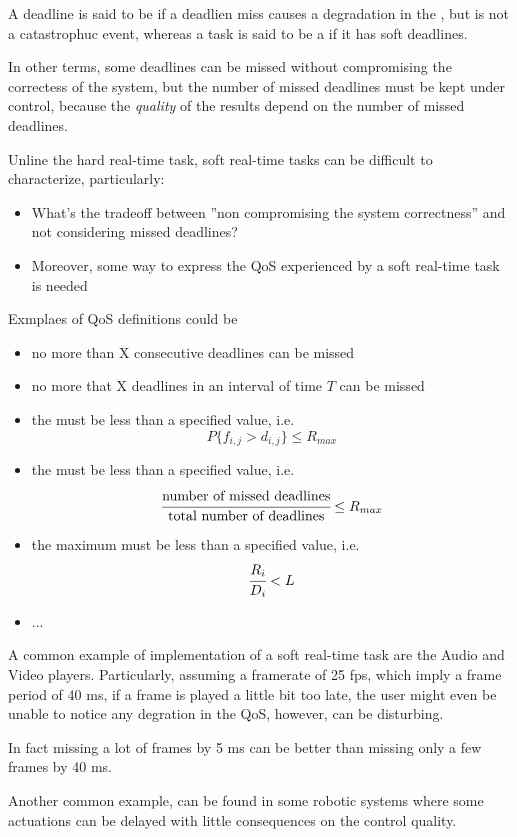A deadline is said to be  if a deadlien miss causes a degradation in the , but is not a catastrophuc event, whereas a task is said to be a  if it has soft deadlines.

In other terms, some deadlines can be missed without compromising the correctess of the system, but the number of missed deadlines must be kept under control, because the \emph{quality} of the results depend on the number of missed deadlines.

Unline the hard real-time task, soft real-time tasks can be difficult to characterize, particularly:
\begin{itemize}
\item What's the tradeoff between ''non compromising the system correctness'' and not considering missed deadlines?
\item Moreover, some way to express the QoS experienced by a soft real-time task is needed
\end{itemize}

Exmplaes of QoS definitions could be
\begin{itemize}
\item no more than X consecutive deadlines can be missed
\item no more that X deadlines in an interval of time $T$ can be missed
\item the  must be less than a specified value, i.e.
\[P\{f_{i,j} > d_{i,j}\} \le R_{max}\]
\item the  must be less than a specified value, i.e.
\[\cfrac{\text{number of missed deadlines}}{\text{total number of deadlines}} \le R_{max}\]
\item the maximum  must be less than a specified value, i.e.
\[\cfrac{R_i}{D_i} < L\]
\item ...
\end{itemize}

A common example of implementation of a soft real-time task are the Audio and Video players. Particularly, assuming a framerate of 25 fps, which imply a frame period of 40 ms, if a frame is played a little bit too late, the user might even be unable to notice any degration in the QoS, however,  can be disturbing.

In fact missing a lot of frames by 5 ms can be better than missing only a few frames by 40 ms.

Another common example, can be found in some robotic systems where some actuations can be delayed with little consequences on the control quality.

